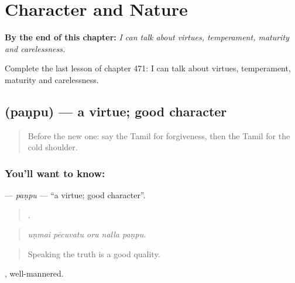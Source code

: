 
\chapter{Character and Nature}
\label{ch:ta-character-and-nature}

\begin{chapteropening}
\textbf{By the end of this chapter:} \emph{I can talk about virtues, temperament, maturity and carelessness.}

Complete the last lesson of chapter 471: I can talk about virtues, temperament, maturity and carelessness.
\end{chapteropening}

\section[\texorpdfstring{\ta{பண்பு} (paṇpu)}{பண்பு (paṇpu)}]{ (paṇpu) — a virtue; good character}

\label{lesson:TA-C471-panpu}



\begin{quote}
Before the new one: say the Tamil for forgiveness, then the Tamil for the cold shoulder.
\end{quote}

\subsection*{You'll want to know: }
\textbf{} — \emph{paṇpu} — \textquotedblleft{}a virtue; good character\textquotedblright{}.

\begin{quote}
    .
\end{quote}

\begin{quote}
\emph{uṇmai pēcuvatu oru nalla paṇpu.}
\end{quote}

\begin{quote}
Speaking the truth is a good quality.
\end{quote}

, well-mannered.

